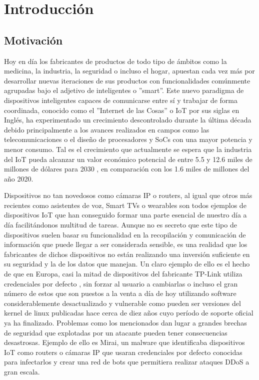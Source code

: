 \chapter{Introducción}
\label{introduccion}

\section{Motivación}
Hoy en día los fabricantes de productos de todo tipo de
ámbitos como la medicina, la industria, la seguridad o incluso el hogar, apuestan cada vez 
más por desarrollar nuevas iteraciones de sus productos con funcionalidades comúnmente agrupadas bajo el 
adjetivo de inteligentes o ''smart''. Este nuevo paradigma de dispositivos inteligentes capaces de 
comunicarse entre sí y trabajar de forma coordinada, conocido como el ''Internet de las Cosas'' o IoT por 
sus siglas en Inglés, ha experimentado un crecimiento descontrolado durante la última década debido 
principalmente a los avances realizados en campos como las telecomunicaciones o el diseño de procesadores y
SoCs con una mayor potencia y menor consumo. Tal es el crecimiento que actualmente se espera que la industria del
IoT pueda alcanzar un valor económico potencial de entre 5.5 y 12.6 miles de millones de dólares para
2030 \cite{McKinsey}, en comparación con los 1.6 miles de millones del año 2020.\bigskip

Dispositivos no tan novedosos como cámaras IP o routers, al igual que otros más 
recientes como asistentes de voz, Smart TVs o wearables son todos ejemplos 
de dispositivos IoT que han conseguido formar una parte esencial de nuestro día a día facilitándonos
multitud de tareas. Aunque no es secreto que este tipo de dispositivos suelen basar su funcionalidad en 
la recopilación y comunicación de información que puede llegar a ser considerada sensible, es una realidad 
que los fabricantes de dichos dispositivos no están realizando una inversión suficiente en su seguridad y 
la de los datos que manejan. Un claro ejemplo de ello es el hecho de que en Europa, casi la mitad 
de dispositivos del fabricante TP-Link utiliza credenciales por defecto \cite{Deepak}, sin forzar al usuario 
a cambiarlas o incluso el gran número de estos que son puestos a la venta a día de hoy utilizando software 
considerablemente desactualizado y vulnerable como pueden ser versiones del kernel de linux publicadas hace cerca de 
diez años cuyo período de soporte oficial ya ha finalizado. Problemas como los mencionados dan lugar a grandes brechas de
seguridad que explotadas por un atacante pueden tener consecuencias desastrosas. Ejemplo de ello es 
Mirai\cite{mirai}, un malware que identificaba dispositivos IoT como routers o cámaras IP que usaran credenciales 
por defecto conocidas para infectarlos y crear una red de bots que permitiera realizar ataques DDoS a gran escala.\bigskip

